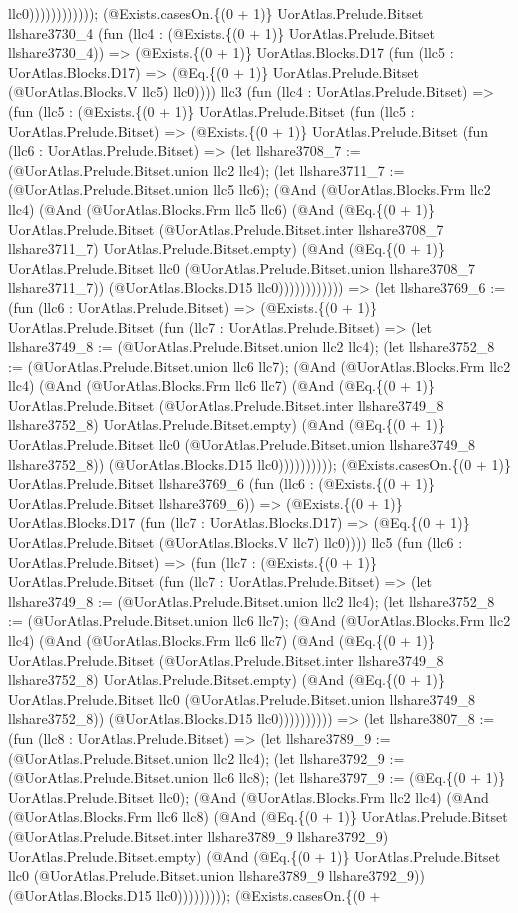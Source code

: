 \documentclass[11pt]{article}
\begin{document}
llc0)))))))))))); (@Exists.casesOn.\{(0 + 1)\} UorAtlas.Prelude.Bitset llshare3730\_4 (fun (llc4 : (@Exists.\{(0 + 1)\} UorAtlas.Prelude.Bitset llshare3730\_4)) => (@Exists.\{(0 + 1)\} UorAtlas.Blocks.D17 (fun (llc5 : UorAtlas.Blocks.D17) => (@Eq.\{(0 + 1)\} UorAtlas.Prelude.Bitset (@UorAtlas.Blocks.V llc5) llc0)))) llc3 (fun (llc4 : UorAtlas.Prelude.Bitset) => (fun (llc5 : (@Exists.\{(0 + 1)\} UorAtlas.Prelude.Bitset (fun (llc5 : UorAtlas.Prelude.Bitset) => (@Exists.\{(0 + 1)\} UorAtlas.Prelude.Bitset (fun (llc6 : UorAtlas.Prelude.Bitset) => (let llshare3708\_7 := (@UorAtlas.Prelude.Bitset.union llc2 llc4); (let llshare3711\_7 := (@UorAtlas.Prelude.Bitset.union llc5 llc6); (@And (@UorAtlas.Blocks.Frm llc2 llc4) (@And (@UorAtlas.Blocks.Frm llc5 llc6) (@And (@Eq.\{(0 + 1)\} UorAtlas.Prelude.Bitset (@UorAtlas.Prelude.Bitset.inter llshare3708\_7 llshare3711\_7) UorAtlas.Prelude.Bitset.empty) (@And (@Eq.\{(0 + 1)\} UorAtlas.Prelude.Bitset llc0 (@UorAtlas.Prelude.Bitset.union llshare3708\_7 llshare3711\_7)) (@UorAtlas.Blocks.D15 llc0)))))))))))) => (let llshare3769\_6 := (fun (llc6 : UorAtlas.Prelude.Bitset) => (@Exists.\{(0 + 1)\} UorAtlas.Prelude.Bitset (fun (llc7 : UorAtlas.Prelude.Bitset) => (let llshare3749\_8 := (@UorAtlas.Prelude.Bitset.union llc2 llc4); (let llshare3752\_8 := (@UorAtlas.Prelude.Bitset.union llc6 llc7); (@And (@UorAtlas.Blocks.Frm llc2 llc4) (@And (@UorAtlas.Blocks.Frm llc6 llc7) (@And (@Eq.\{(0 + 1)\} UorAtlas.Prelude.Bitset (@UorAtlas.Prelude.Bitset.inter llshare3749\_8 llshare3752\_8) UorAtlas.Prelude.Bitset.empty) (@And (@Eq.\{(0 + 1)\} UorAtlas.Prelude.Bitset llc0 (@UorAtlas.Prelude.Bitset.union llshare3749\_8 llshare3752\_8)) (@UorAtlas.Blocks.D15 llc0)))))))))); (@Exists.casesOn.\{(0 + 1)\} UorAtlas.Prelude.Bitset llshare3769\_6 (fun (llc6 : (@Exists.\{(0 + 1)\} UorAtlas.Prelude.Bitset llshare3769\_6)) => (@Exists.\{(0 + 1)\} UorAtlas.Blocks.D17 (fun (llc7 : UorAtlas.Blocks.D17) => (@Eq.\{(0 + 1)\} UorAtlas.Prelude.Bitset (@UorAtlas.Blocks.V llc7) llc0)))) llc5 (fun (llc6 : UorAtlas.Prelude.Bitset) => (fun (llc7 : (@Exists.\{(0 + 1)\} UorAtlas.Prelude.Bitset (fun (llc7 : UorAtlas.Prelude.Bitset) => (let llshare3749\_8 := (@UorAtlas.Prelude.Bitset.union llc2 llc4); (let llshare3752\_8 := (@UorAtlas.Prelude.Bitset.union llc6 llc7); (@And (@UorAtlas.Blocks.Frm llc2 llc4) (@And (@UorAtlas.Blocks.Frm llc6 llc7) (@And (@Eq.\{(0 + 1)\} UorAtlas.Prelude.Bitset (@UorAtlas.Prelude.Bitset.inter llshare3749\_8 llshare3752\_8) UorAtlas.Prelude.Bitset.empty) (@And (@Eq.\{(0 + 1)\} UorAtlas.Prelude.Bitset llc0 (@UorAtlas.Prelude.Bitset.union llshare3749\_8 llshare3752\_8)) (@UorAtlas.Blocks.D15 llc0)))))))))) => (let llshare3807\_8 := (fun (llc8 : UorAtlas.Prelude.Bitset) => (let llshare3789\_9 := (@UorAtlas.Prelude.Bitset.union llc2 llc4); (let llshare3792\_9 := (@UorAtlas.Prelude.Bitset.union llc6 llc8); (let llshare3797\_9 := (@Eq.\{(0 + 1)\} UorAtlas.Prelude.Bitset llc0); (@And (@UorAtlas.Blocks.Frm llc2 llc4) (@And (@UorAtlas.Blocks.Frm llc6 llc8) (@And (@Eq.\{(0 + 1)\} UorAtlas.Prelude.Bitset (@UorAtlas.Prelude.Bitset.inter llshare3789\_9 llshare3792\_9) UorAtlas.Prelude.Bitset.empty) (@And (@Eq.\{(0 + 1)\} UorAtlas.Prelude.Bitset llc0 (@UorAtlas.Prelude.Bitset.union llshare3789\_9 llshare3792\_9)) (@UorAtlas.Blocks.D15 llc0))))))))); (@Exists.casesOn.\{(0 + 
\end{document}
